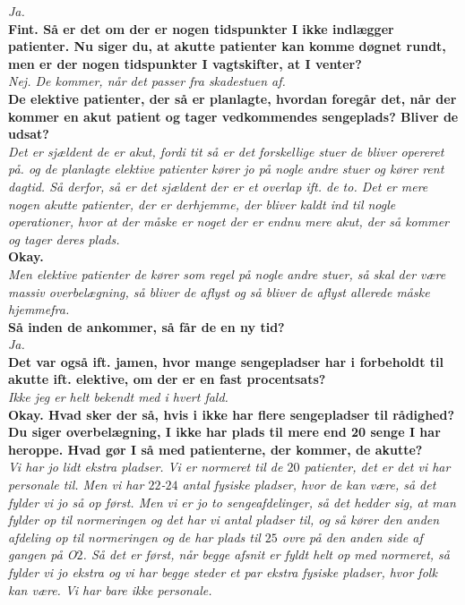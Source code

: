 \noindent
\textit{Ja.} \\
\noindent
\textbf{Fint. Så er det om der er nogen tidspunkter I ikke indlægger patienter. Nu siger du, at akutte patienter kan komme døgnet rundt, men er der nogen tidspunkter I vagtskifter, at I venter?} \\
\noindent
\textit{Nej. De kommer, når det passer fra skadestuen af.} \\
\noindent
\textbf{De elektive patienter, der så er planlagte, hvordan foregår det, når der kommer en akut patient og tager vedkommendes sengeplads? Bliver de udsat?} \\
\noindent
\textit{Det er sjældent de er akut, fordi tit så er det forskellige stuer de bliver opereret på. og de planlagte elektive patienter kører jo på nogle andre stuer og kører rent dagtid. Så derfor, så er det sjældent der er et overlap ift. de to. Det er mere nogen akutte patienter, der er derhjemme, der bliver kaldt ind til nogle operationer, hvor at der måske er noget der er endnu mere akut, der så kommer og tager deres plads.} \\
\noindent
\textbf{Okay.} \\
\noindent
\textit{Men elektive patienter de kører som regel på nogle andre stuer, så skal der være massiv overbelægning, så bliver de aflyst og så bliver de aflyst allerede måske hjemmefra.} \\
\noindent
\textbf{Så inden de ankommer, så får de en ny tid?} \\
\noindent
\textit{Ja.} \\
\noindent
\textbf{Det var også ift. jamen, hvor mange sengepladser har i forbeholdt til akutte ift. elektive, om der er en fast procentsats?} \\
\noindent
\textit{Ikke jeg er helt bekendt med i hvert fald.} \\
\noindent
\textbf{Okay. Hvad sker der så, hvis i ikke har flere sengepladser til rådighed? Du siger overbelægning, I ikke har plads til mere end 20 senge I har heroppe. Hvad gør I så med patienterne, der kommer, de akutte?} \\
\noindent
\textit{Vi har jo lidt ekstra pladser. Vi er normeret til de $20$ patienter, det er det vi har personale til. Men vi har $22$-$24$ antal fysiske pladser, hvor de kan være, så det fylder vi jo så op først. Men vi er jo to sengeafdelinger, så det hedder sig, at man fylder op til normeringen og det har vi antal pladser til, og så kører den anden afdeling op til normeringen og de har plads til $25$ ovre på den anden side af gangen på O$2$. Så det er først, når begge afsnit er fyldt helt op med normeret, så fylder vi jo ekstra og vi har begge steder et par ekstra fysiske pladser, hvor folk kan være. Vi har bare ikke personale.} \\
